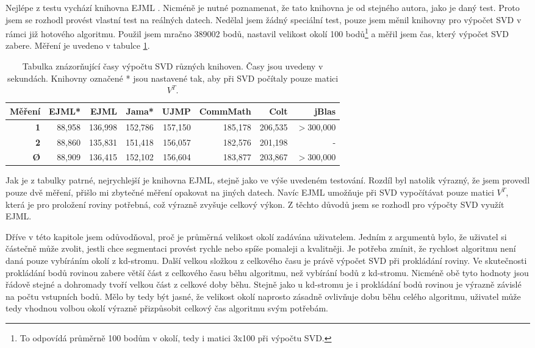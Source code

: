 \documentclass[11pt,twoside,a4paper]{book}
\begin{document}
Nejlépe z testu vychází knihovna EJML \cite{svdlib}. Nicméně je nutné poznamenat, že tato knihovna je od stejného autora, jako je daný test. Proto jsem se rozhodl provést vlastní test na reálných datech. Nedělal jsem žádný speciální test, pouze jsem měnil knihovny pro výpočet SVD v rámci již hotového algoritmu. Použil jsem mračno 389002 bodů, nastavil velikost okolí 100 bodů\footnote{To odpovídá průměrně 100 bodům v okolí, tedy i matici 3x100 při výpočtu SVD.} a měřil jsem čas, který výpočet SVD zabere. Měření je uvedeno v tabulce \ref{table:svdlib}.

\begin{table}[ht]
\resizebox{\textwidth}{!} {
\begin{tabular}{|r|r|r|r|r|r|r|r|}
\hline
\textbf{Měření} & \textbf{EJML*} & \textbf{EJML} & \textbf{Jama*} & \textbf{UJMP} & \textbf{CommMath} & \textbf{Colt} & \textbf{jBlas} \\ \hline
\textbf{1} & 88,958 & 136,998 & 152,786 & 157,150 & 185,178 & 206,535 & $>$300,000 \\ \hline
\textbf{2} & 88,860 & 135,831 & 151,418 & 156,057 & 182,576 & 201,198 & - \\ \hline
\textbf{Ø} & 88,909 & 136,415 & 152,102 & 156,604 & 183,877 & 203,867 & $>$300,000 \\ \hline
\end{tabular}
}
\caption{Tabulka znázorňující časy výpočtu SVD různých knihoven. Časy jsou uvedeny v sekundách. Knihovny označené * jsou nastavené tak, aby při SVD počítaly pouze matici $V^T$.} 
\label{table:svdlib}
\end{table}

Jak je z tabulky patrné, nejrychlejší je knihovna EJML, stejně jako ve výše uvedeném testování. Rozdíl byl natolik výrazný, že jsem provedl pouze dvě měření, přišlo mi zbytečné měření opakovat na jiných datech. Navíc EJML umožňuje při SVD vypočítávat pouze matici $V^T$, která je pro proložení roviny potřebná, což výrazně zvyšuje celkový výkon. Z těchto důvodů jsem se rozhodl pro výpočty SVD využít EJML.

Dříve v této kapitole jsem odůvodňoval, proč je průměrná velikost okolí zadávána u\-ži\-va\-te\-lem. Jedním z argumentů bylo, že uživatel si částečně může zvolit, jestli chce segmentaci provést rychle nebo spíše pomaleji a kvalitněji. Je potřeba zmínit, že rychlost algoritmu není daná pouze vybíráním okolí z kd-stromu. Další velkou složkou z celkového času je právě výpočet SVD při prokládání roviny. Ve skutečnosti prokládání bodů rovinou zabere větší část z celkového času běhu algoritmu, než vybírání bodů z kd-stromu. Nicméně obě tyto hodnoty jsou řádově stejné a dohromady tvoří velkou část z celkové doby běhu. Stejně jako u kd-stromu je i prokládání bodů rovinou je výrazně závislé na počtu vstupních bodů. Mělo by tedy být jasné, že velikost okolí naprosto zásadně ovlivňuje dobu běhu celého algoritmu, uživatel může tedy vhodnou volbou okolí výrazně přizpůsobit celkový čas algoritmu svým potřebám.
\end{document}

